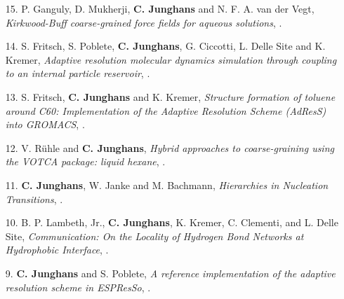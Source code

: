 \documentclass{article}
\begin{document}
\begin{enumerate}
\item[15.] P. Ganguly, D. Mukherji, \textbf{C. Junghans} and N. F. A. van der Vegt,
  \textit{Kirkwood-Buff coarse-grained force fields for aqueous solutions},
  .

\item[14.] S. Fritsch, S. Poblete, \textbf{C. Junghans}, G. Ciccotti, L. Delle Site and K. Kremer,
  \textit{Adaptive resolution molecular dynamics simulation through coupling to an internal particle reservoir},
  .

\item[13.] S. Fritsch, \textbf{C. Junghans} and K. Kremer,
  \textit{Structure formation of toluene around C60: Implementation of the Adaptive Resolution Scheme (AdResS) into GROMACS},
  .

\item[12.] V. R{\"u}hle and \textbf{C. Junghans},
  \textit{Hybrid approaches to coarse-graining using the VOTCA package: liquid hexane},
  .

\item[11.] \textbf{C. Junghans}, W. Janke and M. Bachmann,
  \textit{Hierarchies in Nucleation Transitions},
  .

\item[10.] B. P. Lambeth, Jr., \textbf{C. Junghans}, K. Kremer, C. Clementi, and L. Delle Site, 
  \textit{Communication: On the Locality of Hydrogen Bond Networks at Hydrophobic Interface},
  .

\item[9.] \textbf{C. Junghans} and S. Poblete,
  \textit{A reference implementation of the adaptive resolution scheme in ESPResSo},
  .


\end{enumerate}
\end{document}
